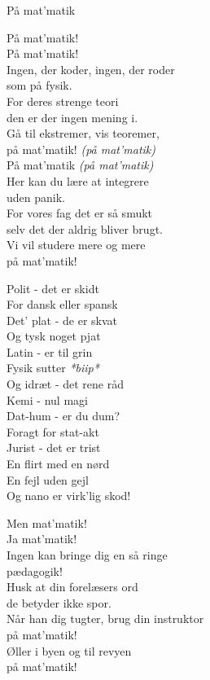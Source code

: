 \begin{song}{På mat'matik}
  \begin{SBChorus}
    På mat’matik!\\
    På mat’matik!\\
    Ingen, der koder, ingen, der roder\\
    som på fysik.\\\medskip
    For deres strenge teori\\
    den er der ingen mening i.\\
    Gå til ekstremer, vis teoremer,\\
    på mat’matik! \emph{(på mat’matik)}\\
    På mat’matik \emph{(på mat’matik)}\\\medskip
    Her kan du lære at integrere\\
    uden panik.\\
    For vores fag det er så smukt\\
    selv det der aldrig bliver brugt.\\
    Vi vil studere mere og mere\\
    på mat’matik!
  \end{SBChorus}

  \begin{SBSection*}
    Polit - det er skidt\\
    For dansk eller spansk\\
    Det’ plat - de er skvat\\
    Og tysk noget pjat\\\medskip
    Latin - er til grin\\
    Fysik sutter \emph{*biip*}\\
    Og idræt - det rene råd\\\medskip
    Kemi - nul magi\\
    Dat-hum - er du dum?\\
    Foragt for stat-akt\\
    Jurist - det er trist\\\medskip
    En flirt med en nørd\\
    En fejl uden gejl\\
    Og nano er virk’lig skod!
  \end{SBSection*}

  \begin{SBChorus}
    Men mat’matik!\\
    Ja mat’matik!\\
    Ingen kan bringe dig en så ringe\\
    pædagogik!\\\medskip
    Husk at din forelæsers ord\\
    de betyder ikke spor.\\
    Når han dig tugter, brug din instruktor\\
    på mat’matik!\\\medskip
    Øller i byen og til revyen\\
    på mat’matik!
  \end{SBChorus}


\end{song}
